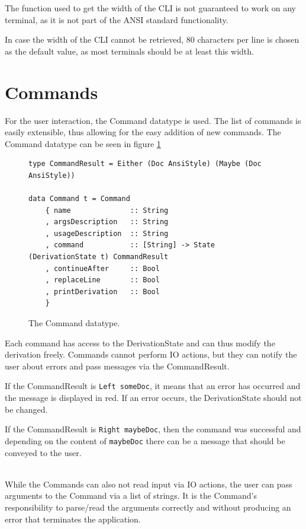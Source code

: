 The function used to get the width of the CLI is not guaranteed to work on any terminal,
as it is not part of the ANSI standard functionality.

In case the width of the CLI cannot be retrieved,
80 characters per line is chosen as the default value,
as most terminals should be at least this width.

\section{Commands}
For the user interaction, the Command datatype is used.
The list of commands is easily extensible,
thus allowing for the easy addition of new commands.
The Command datatype can be seen in figure \ref*{fig:Command}

\begin{figure}[!ht]
\begin{verbatim}     
type CommandResult = Either (Doc AnsiStyle) (Maybe (Doc AnsiStyle))

data Command t = Command
    { name              :: String
    , argsDescription   :: String
    , usageDescription  :: String
    , command           :: [String] -> State (DerivationState t) CommandResult
    , continueAfter     :: Bool
    , replaceLine       :: Bool
    , printDerivation   :: Bool
    }
\end{verbatim}
    \caption{The Command datatype.}
    \label{fig:Command}
\end{figure}

Each command has access to the DerivationState and can thus modify the derivation freely.
Commands cannot perform IO actions,
but they can notify the user about errors and pass messages via the CommandResult.

If the CommandResult is \texttt{Left someDoc},
it means that an error has occurred and the message is displayed in red.
If an error occurs,
the DerivationState should not be changed.

If the CommandResult is \texttt{Right maybeDoc},
then the command was successful and depending on the content of \texttt{maybeDoc} there can be a message that should be conveyed to the user.

\ \\
While the Commands can also not read input via IO actions,
the user can pass arguments to the Command via a list of strings.
It is the Command's responsibility to parse/read the arguments correctly and without producing an error that terminates the application.

